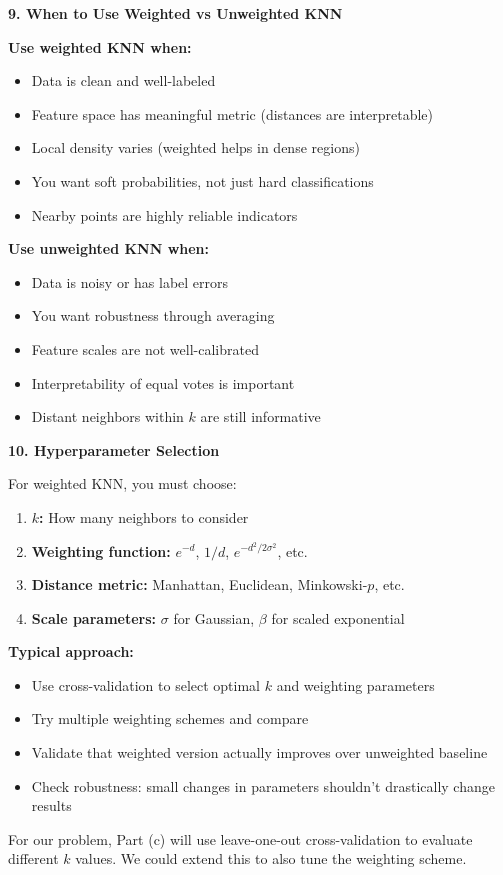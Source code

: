 \documentclass[12pt]{article}
\begin{document}
\begin{explanation}
\textbf{9. When to Use Weighted vs Unweighted KNN}

\textbf{Use weighted KNN when:}
\begin{itemize}
    \item Data is clean and well-labeled
    \item Feature space has meaningful metric (distances are interpretable)
    \item Local density varies (weighted helps in dense regions)
    \item You want soft probabilities, not just hard classifications
    \item Nearby points are highly reliable indicators
\end{itemize}

\textbf{Use unweighted KNN when:}
\begin{itemize}
    \item Data is noisy or has label errors
    \item You want robustness through averaging
    \item Feature scales are not well-calibrated
    \item Interpretability of equal votes is important
    \item Distant neighbors within \(k\) are still informative
\end{itemize}

\textbf{10. Hyperparameter Selection}

For weighted KNN, you must choose:
\begin{enumerate}
    \item \textbf{\(k\):} How many neighbors to consider
    \item \textbf{Weighting function:} \(e^{-d}\), \(1/d\), \(e^{-d^2/2\sigma^2}\), etc.
    \item \textbf{Distance metric:} Manhattan, Euclidean, Minkowski-\(p\), etc.
    \item \textbf{Scale parameters:} \(\sigma\) for Gaussian, \(\beta\) for scaled exponential
\end{enumerate}

\textbf{Typical approach:}
\begin{itemize}
    \item Use cross-validation to select optimal \(k\) and weighting parameters
    \item Try multiple weighting schemes and compare
    \item Validate that weighted version actually improves over unweighted baseline
    \item Check robustness: small changes in parameters shouldn't drastically change results
\end{itemize}

For our problem, Part (c) will use leave-one-out cross-validation to evaluate different \(k\) values. We could extend this to also tune the weighting scheme.
\end{explanation}
\end{document}

